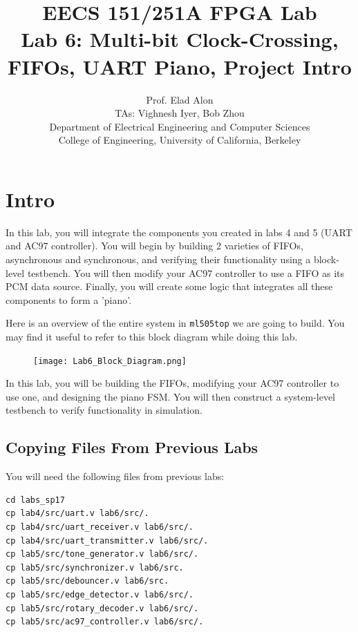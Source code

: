 \documentclass[11pt]{article}
\begin{document}
\title{EECS 151/251A FPGA Lab\\
Lab 6: Multi-bit Clock-Crossing, FIFOs, UART Piano, Project Intro}

\author{Prof. Elad Alon \\
TAs: Vighnesh Iyer, Bob Zhou \\Department of Electrical Engineering and Computer Sciences\\
College of Engineering, University of California, Berkeley}
\date{}
\maketitle

\tableofcontents

\section{Intro}
In this lab, you will integrate the components you created in labs 4 and 5 (UART and AC97 controller). You will begin by building 2 varieties of FIFOs, asynchronous and synchronous, and verifying their functionality using a block-level testbench. You will then modify your AC97 controller to use a FIFO as its PCM data source. Finally, you will create some logic that integrates all these components to form a 'piano'.

Here is an overview of the entire system in \verb|ml505top| we are going to build. You may find it useful to refer to this block diagram while doing this lab.

\begin{figure}[H]
	\centerline{\texttt{[image: Lab6\_Block\_Diagram.png]}}
\end{figure}

In this lab, you will be building the FIFOs, modifying your AC97 controller to use one, and designing the piano FSM. You will then construct a system-level testbench to verify functionality in simulation.

\subsection{Copying Files From Previous Labs}
You will need the following files from previous labs:

\begin{verbatim}
cd labs_sp17
cp lab4/src/uart.v lab6/src/.
cp lab4/src/uart_receiver.v lab6/src/.
cp lab4/src/uart_transmitter.v lab6/src/.
cp lab5/src/tone_generator.v lab6/src/.
cp lab5/src/synchronizer.v lab6/src.
cp lab5/src/debouncer.v lab6/src.
cp lab5/src/edge_detector.v lab6/src/.
cp lab5/src/rotary_decoder.v lab6/src/.
cp lab5/src/ac97_controller.v lab6/src/.
\end{verbatim}
\end{document}
